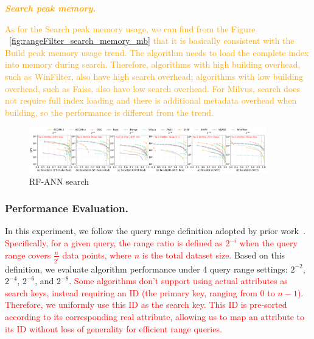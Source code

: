 \documentclass[sigconf, nonacm]{acmart}
\begin{document}
		\textit{\textbf{\textcolor{orange}{Search peak memory.}}}
		
		
		\textcolor{orange}{As for the Search peak memory usage, we can find from the Figure ~\ref{fig:rangeFilter_search_memory_mb} that it is basically consistent with the Build peak memory usage trend. The algorithm needs to load the complete index into memory during search. Therefore, algorithms with high building overhead, such as WinFilter, also have high search overhead; algorithms with low building overhead, such as Faiss, also have low search overhead. For Milvus, search does not require full index loading and there is additional metadata overhead when building, so the performance is different from the trend.}
		
	\begin{figure}[t]
		
		\centering
		
		\includegraphics[width=0.92\textwidth]{figures/exp/exp_8_2.pdf}
		\caption{RF-ANN search }
		\label{fig:exp_8_2}
	\end{figure}
	
	
	\subsubsection{Performance Evaluation. }
	
	In this experiment, we follow the query range definition adopted by prior work~\cite{HQI}. \textcolor{red}{Specifically, for a given query, the range ratio is defined as $2^{-i}$	when the query range covers $\frac{n}{2^i}$ data points, where $n$ is the total dataset size.} Based on this definition, we evaluate algorithm performance under 4 query range settings: $2^{-2}$, $2^{-4}$, $2^{-6}$, and $2^{-8}$. \textcolor{red}{Some algorithms don't support using actual attributes as search keys, instead requiring an ID (the primary key, ranging from $0$ to $n-1$). Therefore, we uniformly use this ID as the search key. This ID is pre-sorted according to its corresponding real attribute, allowing us to map an attribute to its ID without loss of generality for efficient range queries.}
	
\end{document}
